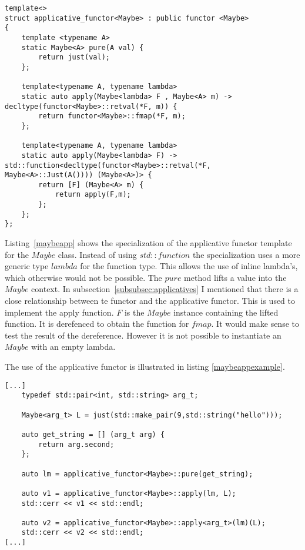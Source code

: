\documentclass[12pt,fleqn]{article}
\begin{document}
%
%
\begin{minipage}{\linewidth}
\begin{lstlisting}[caption=Maybe applicative functor, label=maybeapp ]
template<>
struct applicative_functor<Maybe> : public functor <Maybe>
{
	template <typename A> 
	static Maybe<A> pure(A val) {
		return just(val);
	};
	
	template<typename A, typename lambda>
	static auto apply(Maybe<lambda> F , Maybe<A> m) -> decltype(functor<Maybe>::retval(*F, m)) { 
		return functor<Maybe>::fmap(*F, m);
	};

	template<typename A, typename lambda>
	static auto apply(Maybe<lambda> F) -> std::function<decltype(functor<Maybe>::retval(*F, Maybe<A>::Just(A()))) (Maybe<A>)> {
		return [F] (Maybe<A> m) {
			return apply(F,m);
		};
	};
};
\end{lstlisting}
\end{minipage}
%
%
%
%
Listing~\ref{maybeapp} shows the specialization of the applicative functor template for the $Maybe$ class.
Instead of using $std::function$ the specialization uses a more generic type $lambda$ for the function type.
This allows the use of inline lambda's, which otherwise would not be possible.
The $pure$ method lifts a value into the $Maybe$ context.
In subsection~\ref{subsubsec:applicatives} I mentioned that there is a close relationship between te functor and the applicative functor.
This is used to implement the apply function. $F$ is the $Maybe$ instance containing the lifted function. 
It is derefenced to obtain the function for $fmap$.
It would make sense to test the result of the dereference. However it is not possible to instantiate an $Maybe$ with an empty lambda. 

The use of the applicative functor is illustrated in listing \ref{maybeappexample}.


%
%
\begin{minipage}{\linewidth}
\begin{lstlisting}[caption=example of the maybe applicative, label=maybeappexample]
[...]
	typedef std::pair<int, std::string> arg_t;

	Maybe<arg_t> L = just(std::make_pair(9,std::string("hello")));

	auto get_string = [] (arg_t arg) {
		return arg.second;
	};

	auto lm = applicative_functor<Maybe>::pure(get_string);

	auto v1 = applicative_functor<Maybe>::apply(lm, L);
	std::cerr << v1 << std::endl;

	auto v2 = applicative_functor<Maybe>::apply<arg_t>(lm)(L);
	std::cerr << v2 << std::endl;
[...]
\end{lstlisting}
\end{minipage}
%
%
%
\end{document}

